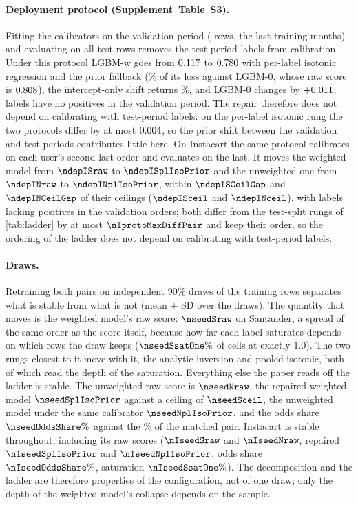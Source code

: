 \documentclass[sigconf,nonacm]{acmart}
\newcommand{\Sm}{\textsf{LGBM-w}\xspace}
\newcommand{\Nm}{\textsf{LGBM-0}\xspace}
\newcommand{\Supp}[1]{Supplement~#1}  %
\begin{document}
\paragraph{Deployment protocol (\Supp{Table~S3}).} Fitting the calibrators on the validation period (\nnValRows{} rows, the last training months) and evaluating on all \nnTest{} test rows removes the test-period labels from calibration. Under this protocol \Sm goes from $0.117$ to $0.780$ with per-label isotonic regression and the prior fallback (\ndepSrepairShare\% of its loss against \Nm, whose raw score is $0.808$), the intercept-only shift returns \ndepSoffsetShare\%, and \Nm changes by $+0.011$; \ndepSnDeadVal{} labels have no positives in the validation period. The repair therefore does not depend on calibrating with test-period labels: on the per-label isotonic rung the two protocols differ by at most $0.004$, so the prior shift between the validation and test periods contributes little here.
On Instacart the same protocol calibrates on each user's second-last order and evaluates on the last. It moves the weighted model from $\ndepISraw$ to $\ndepISplIsoPrior$ and the unweighted one from $\ndepINraw$ to $\ndepINplIsoPrior$, within $\ndepISCeilGap$ and $\ndepINCeilGap$ of their ceilings ($\ndepISceil$ and $\ndepINceil$), with \ndepISnDeadVal{} labels lacking positives in the validation orders; both differ from the test-split rungs of \cref{tab:ladder} by at most $\nIprotoMaxDiffPair$ and keep their order, so the ordering of the ladder does not depend on calibrating with test-period labels.

\paragraph{Draws.} Retraining both pairs on \nseedN{} independent 90\% draws of the training rows separates what is stable from what is not (mean $\pm$ SD over the draws). The quantity that moves is the weighted model's raw score: $\nseedSraw$ on Santander, a spread of the same order as the score itself, because how far each label saturates depends on which rows the draw keeps ($\nseedSsatOne\%$ of cells at exactly $1.0$). The two rungs closest to it move with it, the analytic inversion and pooled isotonic, both of which read the depth of the saturation. Everything else the paper reads off the ladder is stable. The unweighted raw score is $\nseedNraw$, the repaired weighted model $\nseedSplIsoPrior$ against a ceiling of $\nseedSceil$, the unweighted model under the same calibrator $\nseedNplIsoPrior$, and the odds share $\nseedOddsShare\%$ against the \noddsShare\% of the matched pair. Instacart is stable throughout, including its raw scores ($\nIseedSraw$ and $\nIseedNraw$, repaired $\nIseedSplIsoPrior$ and $\nIseedNplIsoPrior$, odds share $\nIseedOddsShare\%$, saturation $\nIseedSsatOne\%$). The decomposition and the ladder are therefore properties of the configuration, not of one draw; only the depth of the weighted model's collapse depends on the sample.
\end{document}
